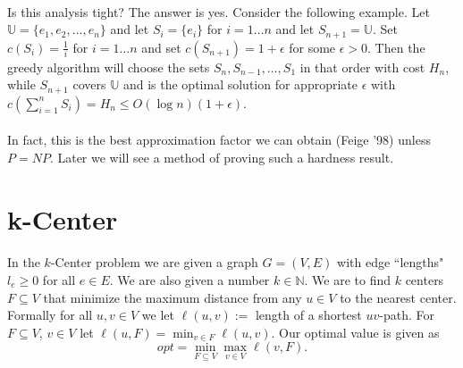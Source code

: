\documentclass[letterpaper,12pt,oneside,onecolumn]{article}
\newcommand{\N}{\mathbb{N}} \newcommand{\R}{\mathbb{R}}
\newcommand{\U}{\mathbb{U}}
\begin{document}
\paragraph{}
Is this analysis tight? The answer is yes. Consider the following example. Let $\U = \{e_1, e_2, \dots, e_n\}$ and let $S_i = \{e_i\}$ for $i = 1 \dots n$ and let $S_{n+1} = \U$. Set $c(S_i) = \frac{1}{i}$ for $i = 1 \dots n$ and set $c(S_{n+1}) = 1 + \epsilon$ for some $\epsilon > 0$. Then the greedy algorithm will choose the sets $S_n, S_{n-1}, \dots, S_1$ in that order with cost $H_n$, while $S_{n+1}$ covers $\U$ and is the optimal solution for appropriate $\epsilon$ with $c(\sum_{i=1}^n S_i) = H_n \leq O(\log n) (1+\epsilon)$.
\paragraph{}
In fact, this is the best approximation factor we can obtain (Feige '98) unless $P = NP$. Later we will see a method of proving such a hardness result.
\section{k-Center}
\paragraph{}
In the $k$-Center problem we are given a graph $G = (V,E)$ with edge ``lengths" $l_e \geq 0$ for all $e \in E$. We are also given a number $k \in \N$. We are to find $k$ centers $F \subseteq V$ that minimize the maximum distance from any $u \in V$ to the nearest center. Formally  for all $u,v \in V$ we let $\ell(u,v) := $ length of a shortest $uv$-path. For $F \subseteq V$, $v \in V$ let $\ell (u,F) = \min_{v \in F} \ell(u,v)$. Our optimal value is given as
$$ opt = \min_{F \subseteq V} \max_{v \in V} \ell (v,F).$$
\end{document}
